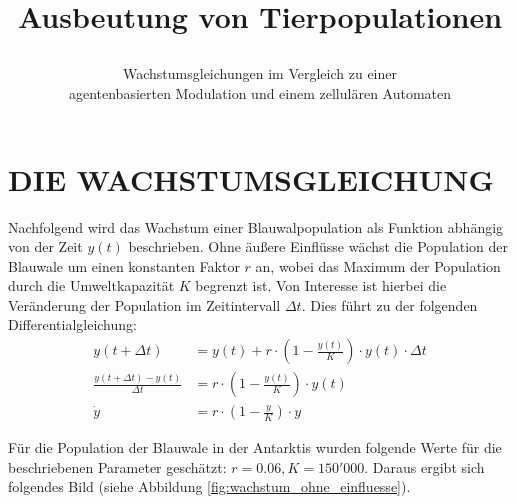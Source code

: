 \documentclass[a4paper,twoside]{article}
\begin{document}
	\title{Ausbeutung von Tierpopulationen\subtitle{Wachstumsgleichungen im Vergleich zu einer\\agentenbasierten Modulation und einem zellulären Automaten} }
	
	\author{}
	

	
	\onecolumn \maketitle \normalsize \vfill

	\section{\uppercase{Die Wachstumsgleichung}}\label{sec:Wachstumsgleichung}

	\noindent Nachfolgend wird das Wachstum einer Blauwalpopulation als Funktion abhängig von der Zeit \(y(t)\) beschrieben. Ohne äußere Einflüsse wächst die Population der Blauwale um einen konstanten Faktor \(r\) an, wobei das Maximum der Population durch die Umweltkapazität \(K\) begrenzt ist. Von Interesse ist hierbei die Veränderung der Population im Zeitintervall \(\Delta t\). Dies führt zu der folgenden Differentialgleichung:
	\begin{align*}
		y(t+\Delta t) &= y(t) + r\cdot\left(1-\frac{y(t)}{K}\right) \cdot y(t) \cdot \Delta t \\
		\frac{y(t+\Delta t) - y(t)}{\Delta t} &= r \cdot\left(1-\frac{y(t)}{K}\right) \cdot y(t) \\
		\dot{y} &= r \cdot\left(1-\frac{y}{K}\right) \cdot y
	\end{align*}

	Für die Population der Blauwale in der Antarktis \cite{Skript} wurden folgende Werte für die beschriebenen Parameter geschätzt: \(r = 0.06, K = 150'000\). Daraus ergibt sich folgendes Bild (siehe Abbildung \ref{fig:wachstum_ohne_einfluesse}).
	
\end{document}
